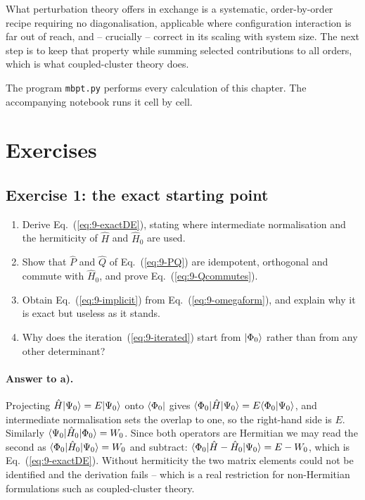 What perturbation theory offers in exchange is a systematic, order-by-order
recipe requiring no diagonalisation, applicable where configuration
interaction is far out of reach, and -- crucially -- correct in its scaling
with system size.  The next step is to keep that property while summing
selected contributions to all orders, which is what coupled-cluster theory
does.

The program \texttt{mbpt.py} performs every calculation of this chapter.
The accompanying notebook runs it cell by cell.

\section{Exercises}
\label{sec:ch9exercises}

\subsection*{Exercise 1: the exact starting point}
\label{ex:9-exact}

\begin{enumerate}
  \item[a)] Derive Eq.~(\ref{eq:9-exactDE}), stating where intermediate
  normalisation and the hermiticity of $\hat{H}$ and $\hat{H}_0$ are used.
  \item[b)] Show that $\hat{P}$ and $\hat{Q}$ of Eq.~(\ref{eq:9-PQ}) are
  idempotent, orthogonal and commute with $\hat{H}_0$, and prove
  Eq.~(\ref{eq:9-Qcommutes}).
  \item[c)] Obtain Eq.~(\ref{eq:9-implicit}) from
  Eq.~(\ref{eq:9-omegaform}), and explain why it is exact but useless as it
  stands.
  \item[d)] Why does the iteration~(\ref{eq:9-iterated}) start from
  $\vert \Phi_0 \rangle$ rather than from any other determinant?
\end{enumerate}

\paragraph{Answer to a).}
Projecting $\hat{H}\vert \Psi_0 \rangle=E\vert \Psi_0 \rangle$ onto $\langle \Phi_0 \vert$ gives
$\langle \Phi_0 | \hat{H} | \Psi_0 \rangle=E\langle \Phi_0 \vert \Psi_0 \rangle$, and
intermediate normalisation sets the overlap to one, so the right-hand side is
$E$.  Similarly $\langle \Psi_0 | \hat{H}_0 | \Phi_0 \rangle=W_0$.  Since both
operators are Hermitian we may read the second as
$\langle \Phi_0 | \hat{H}_0 | \Psi_0 \rangle=W_0$ and subtract:
$\langle \Phi_0 | \hat{H}-\hat{H}_0 | \Psi_0 \rangle=E-W_0$, which is
Eq.~(\ref{eq:9-exactDE}).  Without hermiticity the two matrix elements could
not be identified and the derivation fails -- which is a real restriction for
non-Hermitian formulations such as coupled-cluster theory.

